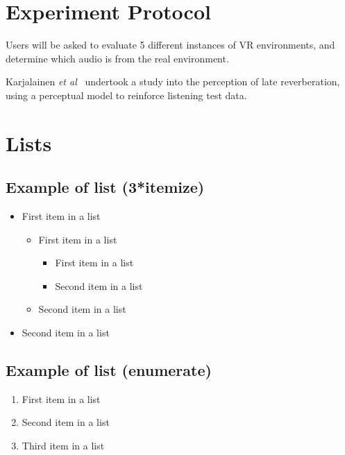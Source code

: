 \documentclass[paper=a4, fontsize=10pt, font=arial]{scrartcl} %
\numberwithin{equation}{section} %
\numberwithin{figure}{section} %
\numberwithin{table}{section} %
\begin{document}
\section{Experiment Protocol}



Users will be asked to evaluate 5 different instances of VR environments, and determine which audio is from the real environment.

Karjalainen \textit{et al}~\cite{Karjalainen2001} undertook a study into the perception of late reverberation, using a perceptual model to reinforce listening test data.


\section{Lists}


\subsection{Example of list (3*itemize)}
\begin{itemize}
	\item First item in a list 
		\begin{itemize}
		\item First item in a list 
			\begin{itemize}
			\item First item in a list 
			\item Second item in a list 
			\end{itemize}
		\item Second item in a list 
		\end{itemize}
	\item Second item in a list 
\end{itemize}

\subsection{Example of list (enumerate)}
\begin{enumerate}
\item First item in a list 
\item Second item in a list 
\item Third item in a list
\end{enumerate}
\end{document}
